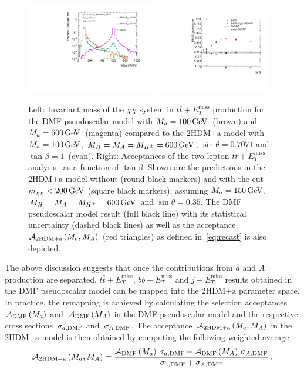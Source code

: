 \documentclass[a4paper, 11pt,notoc]{article}
\newcommand{\MET}{\ensuremath{E_T^\mathrm{miss}}\xspace}
\newcommand{\mA}{\ensuremath{M_{A}}\xspace}
\newcommand{\ma}{\ensuremath{M_{a}}\xspace}
\newcommand{\mH}{\ensuremath{M_{H}}\xspace}
\newcommand{\mHc}{\ensuremath{M_{H^{\pm}}}\xspace}
\newcommand{\hdma}{\ensuremath{\textrm{2HDM+a}}\xspace}
\begin{document}
\begin{figure}[t!]
\centering
\includegraphics[width=0.5\textwidth]{mchichi.pdf}
\includegraphics[width=0.45\textwidth]{plotacc_tb.pdf}
\vspace{2mm}
\caption{ \label{fig:mchichi_DMsimpV2HDMa}
Left: Invariant mass of the $\chi\bar{\chi}$ system in $t \bar t + \MET$ production for the DMF pseudoscalar model with $\ma =100 \, {\rm  GeV}$~(brown) and $\ma =600 \, {\rm  GeV}$~(magenta) compared to the \hdma model with $\ma = 100 \, {\rm  GeV}$, $\mH = \mA = \mHc = 600 \, {\rm  GeV}$, $\sin\theta=0.7071$ and $\tan\beta=1$~(cyan). Right: Acceptances of the   two-lepton $t \bar t + \MET$ analysis~\cite{Aaboud:2017rzf}  as a function of $\tan\beta$.  Shown are the predictions in the \hdma model without (round black markers) and with the cut $m_{\chi \bar \chi} <200 \, {\rm GeV}$ (square black markers), assuming $\ma = 150 \, {\rm GeV}$, $\mH= \mA = \mHc = 600 \, {\rm GeV}$ and $\sin\theta=0.35$. The DMF pseudoscalar model result (full black line) with its statistical uncertainty (dashed black lines) as well as the acceptance  ${\cal A}_{\hdma} \left (\ma, \mA \right )$ (red triangles) as defined in~\eqref{eq:recast} is also depicted.}
\end{figure}

The above discussion suggests that once the contributions from $a$ and $A$ production are separated, $t \bar t + \MET$, $b \bar b + \MET$ and $j + \MET$  results obtained in the DMF pseudoscalar model can be mapped into the $\hdma$ parameter space. In practice, the remapping is achieved by calculating the selection acceptances~${\cal A}_{\rm DMF} \left ( \ma \right )$ and~${\cal A}_{\rm DMF} \left ( \mA \right )$ in the DMF pseudoscalar model and the respective cross sections~$\sigma_{a, {\rm DMF}}$ and~$\sigma_{A, {\rm DMF}}$. The acceptance~${\cal A}_{\hdma} \left (\ma, \mA \right )$ in the \hdma model  is then obtained by computing the following weighted average
\begin{equation} \label{eq:recast}
{\cal A}_{\hdma} \left (\ma, \mA \right )=\frac{ {\cal A}_{\rm DMF} \left ( \ma \right )\, \sigma_{a, {\rm DMF}} + {\cal A}_{\rm DMF} \left ( \mA \right ) \, \sigma_{A, {\rm DMF}} }{\sigma_{a, {\rm DMF}}+\sigma_{A, {\rm DMF}}} \,.
\end{equation}
\end{document}
